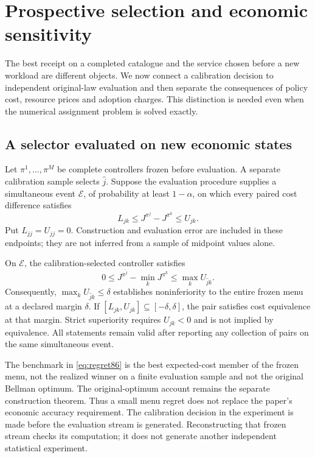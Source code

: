 \section{Prospective selection and economic sensitivity}\label{sec:decision86}
The best receipt on a completed catalogue and the service chosen before a new workload are different objects. We now connect a calibration decision to independent original-law evaluation and then separate the consequences of policy cost, resource prices and adoption charges. This distinction is needed even when the numerical assignment problem is solved exactly.

\subsection{A selector evaluated on new economic states}
Let $\pi^1,\ldots,\pi^M$ be complete controllers frozen before evaluation. A separate calibration sample selects $\widehat j$. Suppose the evaluation procedure supplies a simultaneous event $\mathcal E$, of probability at least $1-\alpha$, on which every paired cost difference satisfies
\[
 L_{jk}\le J^{\pi^j}-J^{\pi^k}\le U_{jk}.
\]
Put $L_{jj}=U_{jj}=0$. Construction and evaluation error are included in these endpoints; they are not inferred from a sample of midpoint values alone.

\begin{proposition}\label{prop:selection86}
On $\mathcal E$, the calibration-selected controller satisfies
\begin{equation}\label{eq:regret86}
 0\le J^{\pi^{\widehat j}}-\min_kJ^{\pi^k}
 \le \max_k U_{\widehat j k}.
\end{equation}
Consequently, $\max_k U_{\widehat j k}\le\delta$ establishes noninferiority to the entire frozen menu at a declared margin $\delta$. If $[L_{jk},U_{jk}]\subseteq[-\delta,\delta]$, the pair satisfies cost equivalence at that margin. Strict superiority requires $U_{jk}<0$ and is not implied by equivalence. All statements remain valid after reporting any collection of pairs on the same simultaneous event.
\end{proposition}

The benchmark in \eqref{eq:regret86} is the best expected-cost member of the frozen menu, not the realized winner on a finite evaluation sample and not the original Bellman optimum. The original-optimum account remains the separate construction theorem. Thus a small menu regret does not replace the paper's economic accuracy requirement. The calibration decision in the experiment is made before the evaluation stream is generated. Reconstructing that frozen stream checks its computation; it does not generate another independent statistical experiment.

